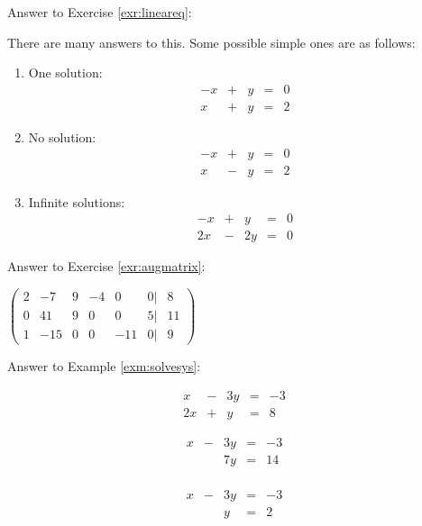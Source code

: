 \documentclass[]{book}
\theoremstyle{definition}
\theoremstyle{definition}
\theoremstyle{definition}
\theoremstyle{remark}
\begin{document}
Answer to Exercise \ref{exr:lineareq}:

There are many answers to this. Some possible simple ones are as
follows:

\begin{enumerate}
\def\labelenumi{\arabic{enumi}.}
\item
  One solution: \[\begin{matrix}
          -x  & + & y & = & 0\\
          x & + &  y & = &  2
          \end{matrix}\]
\item
  No solution: \[\begin{matrix}
          -x  & + & y & = & 0\\
          x & - &  y & = &  2
          \end{matrix}\]
\item
  Infinite solutions: \[\begin{matrix}
          -x  & + & y & = & 0\\
          2x & - &  2y & = &  0
          \end{matrix}\]
\end{enumerate}

Answer to Exercise \ref{exr:augmatrix}:

\(\begin{pmatrix}  2 & -7 & 9 & -4 & 0 & 0| & 8\\  0 & 41 & 9 & 0 & 0 & 5 | & 11\\  1 & -15 & 0 & 0 & -11 & 0 | & 9  \end{pmatrix}\)

Answer to Example \ref{exm:solvesys}:

\[\begin{matrix}
            x  & - & 3y & = & -3\\
            2x & + &  y & = &  8
            \end{matrix}\]

\[\begin{matrix}
            x  & - & 3y & = & -3\\
               &   & 7y & = & 14\\          
            \end{matrix}\]

\[\begin{matrix}
            x  & - & 3y & = & -3\\
               &   & y & = & 2\\            
            \end{matrix}\]
\end{document}
